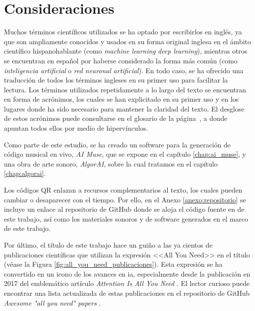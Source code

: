 \section{Consideraciones}


Muchos términos científicos utilizados se ha optado por escribirlos en inglés, ya que son ampliamente conocidos y usados en su forma original inglesa en el ámbito científico hispanohablante (como \emph{machine learning} \emph{deep learning}), mientras otros se encuentran en español por haberse considerado la forma más común (como \emph{inteligencia artificial} o \emph{red neuronal artificial}). En todo caso, se ha ofrecido una traducción de todos los términos ingleses en su primer uso para facilitar la lectura. Los términos utilizados repetidamente a lo largo del texto se encuentran en forma de acrónimos, los cuales se han explicitado en su primer uso y en los lugares donde ha sido necesario para mantener la claridad del texto. El desglose de estos acrónimos puede consultarse en el glosario de la página~\pageref{chap:glosario}, a donde apuntan todos ellos por medio de hipervínculos.

Como parte de este estudio, se ha creado un software para la generación de código musical en vivo, \emph{AI Muse}, que se expone en el capítulo \ref{chap:ai_muse}, y una obra de arte sonoro, \emph{AlgorAI}, sobre la cual tratamos en el capítulo \ref{chap:algorai}.

Los códigos QR enlazan a recursos complementarios al texto, los cuales pueden cambiar o desaparecer con el tiempo. Por ello, en el Anexo \ref{anexo:repositorio} se incluye un enlace al repositorio de GitHub donde se aloja el código fuente en  de este trabajo, así como los materiales sonoros y de software generados en el marco de este trabajo.

Por último, el título de este trabajo hace un guiño a las ya cientos de publicaciones científicas que utilizan la expresión <<All You Need>> en el título (véase la Figura \ref{fig:all_you_need_publicaciones}). Esta expresión se ha convertido en un icono de los avances en \gls{ia}, especialmente desde la publicación en 2017 del emblemático artículo \emph{Attention Is All You Need} \citep{vaswaniAttentionAllYou2017}. El lector curioso puede encontrar una lista actualizada de estas publicaciones en el repositorio de GitHub \emph{Awesome "all you need" papers} \citep{nishiKentoNishiAwesomeallyouneedpapers2024}.


